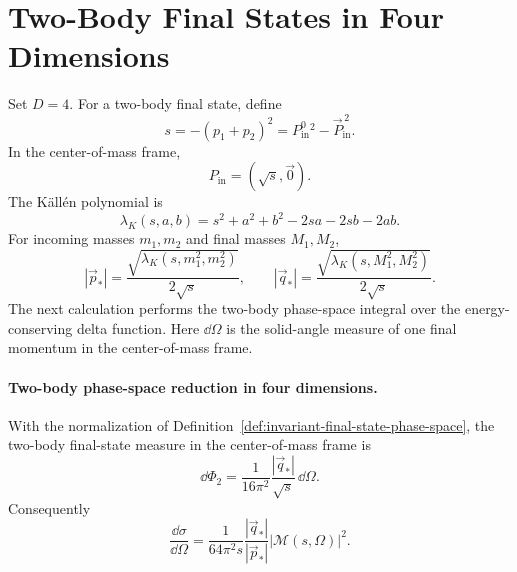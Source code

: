 \begin{center}
\end{center}

\section{Two-Body Final States in Four Dimensions}

Set \(D=4\).  For a two-body final state, define
\[
  s=-(p_1+p_2)^2=P_{\mathrm{in}}^0{}^2-\vec P_{\mathrm{in}}^{\,2}.
\]
In the center-of-mass frame,
\[
  P_{\mathrm{in}}=(\sqrt s,\vec0).
\]
The K\"all\'en polynomial is
\[
  \lambda_K(s,a,b)=s^2+a^2+b^2-2sa-2sb-2ab .
\]
For incoming masses \(m_1,m_2\) and final masses \(M_1,M_2\),
\[
  |\vec p_*|
  =
  \frac{\sqrt{\lambda_K(s,m_1^2,m_2^2)}}{2\sqrt s},
  \qquad
  |\vec q_*|
  =
  \frac{\sqrt{\lambda_K(s,M_1^2,M_2^2)}}{2\sqrt s}.
\]
The next calculation performs the two-body phase-space integral over the
energy-conserving delta function.  Here \(\dd\Omega\) is the solid-angle
measure of one final momentum in the center-of-mass frame.

\paragraph{Two-body phase-space reduction in four dimensions.}
With the normalization of Definition~\ref{def:invariant-final-state-phase-space},
the two-body final-state measure in the center-of-mass frame is
\[
  \dd\Phi_2
  =
  \frac{1}{16\pi^2}
  \frac{|\vec q_*|}{\sqrt s}\,\dd\Omega .
\]
Consequently
\[
  \frac{\dd\sigma}{\dd\Omega}
  =
  \frac{1}{64\pi^2s}
  \frac{|\vec q_*|}{|\vec p_*|}
  |\mathcal M(s,\Omega)|^2 .
\]

